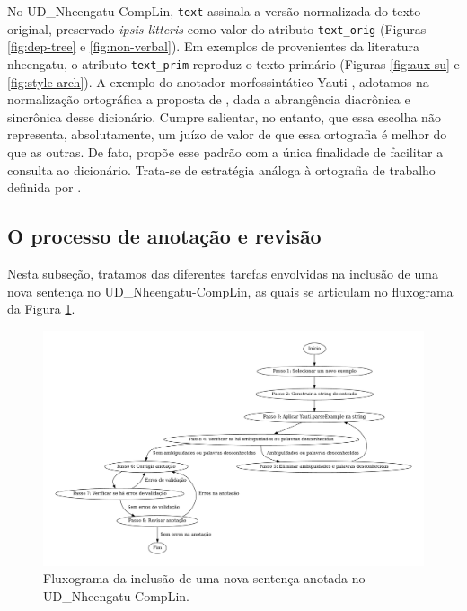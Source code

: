 \documentclass[portuguese]{textolivre}
\newcommand{\tbc}{UD\_Nheengatu-CompLin}
\newcommand{\pvtres}{\parencite{alencar2023-yauti}}
\begin{document}
No \tbc, \texttt{text} assinala a versão normalizada do texto original, preservado \textit{ipsis litteris} como valor do atributo \texttt{text\_orig} (Figuras \ref{fig:dep-tree} e \ref{fig:non-verbal}). Em exemplos de \textcite{avila2021} provenientes da literatura nheengatu, o atributo \texttt{text\_prim} reproduz o texto primário (Figuras \ref{fig:aux-su} e \ref{fig:style-arch}). A exemplo do anotador morfossintático Yauti \pvtres, adotamos na normalização ortográfica a proposta de \textcite{avila2021}, dada a abrangência diacrônica e sincrônica desse dicionário. Cumpre salientar, no entanto, que essa escolha não representa, absolutamente, um juízo de valor de que essa ortografia é melhor do que as outras. De fato, \textcite{avila2021}  propõe esse padrão com a única finalidade de facilitar a consulta ao dicionário. Trata-se de estratégia análoga à ortografia de trabalho definida por \textcite{DAngelis-2021}.
	 
\subsection{O processo de anotação e revisão}\label{subsec:processo}
Nesta subseção, tratamos das diferentes tarefas envolvidas na inclusão de uma nova sentença no \tbc, as quais se articulam no fluxograma da Figura \ref{fig:fluxograma-anotacao}.

\begin{figure}[htbp]
  \centering
  \begin{minipage}{.9\textwidth}
    \includegraphics[width=\linewidth]{figures/fluxo-anotacao-1.pdf}
    \caption{Fluxograma da inclusão de uma nova sentença anotada no \tbc.}
    \label{fig:fluxograma-anotacao}
  \end{minipage}
\end{figure}
\end{document}
